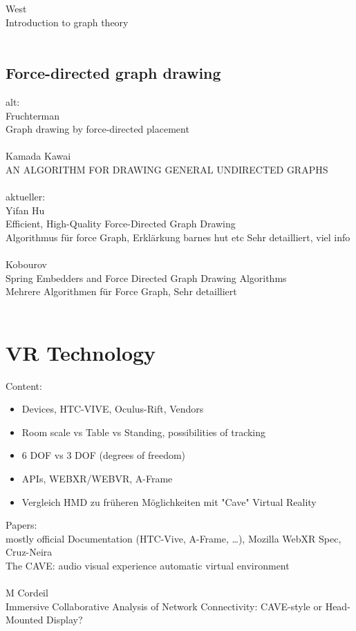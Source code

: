 West\\
Introduction to graph theory\\
\\

\subsection{Force-directed graph drawing}
alt:\\
Fruchterman\\
Graph drawing by force-directed placement\\
\\
Kamada Kawai\\
AN ALGORITHM FOR DRAWING GENERAL UNDIRECTED GRAPHS\\
\\

aktueller:\\
Yifan Hu\\
Efficient, High-Quality Force-Directed Graph Drawing\\
Algorithmus für force Graph,  Erklärkung barnes hut etc Sehr detailliert, viel info\\
\\
Kobourov\\
Spring Embedders and Force Directed Graph Drawing Algorithms\\
Mehrere Algorithmen für Force Graph, Sehr detailliert\\
\\

\section{VR Technology}

Content:
\begin{itemize}
    \item Devices, HTC-VIVE, Oculus-Rift, Vendors
    \item Room scale vs Table vs Standing, possibilities of tracking
    \item 6 DOF vs 3 DOF (degrees of freedom)
    \item APIs, WEBXR/WEBVR, A-Frame 
    \item Vergleich HMD zu früheren Möglichkeiten mit "Cave" Virtual Reality
\end{itemize}

Papers:\\
mostly official Documentation (HTC-Vive, A-Frame, \dots ), Mozilla WebXR Spec,
\\
Cruz-Neira\\
The CAVE: audio visual experience automatic virtual environment\\
\\
M Cordeil\\
Immersive Collaborative Analysis of Network Connectivity: CAVE-style or Head-Mounted Display?\\
\\